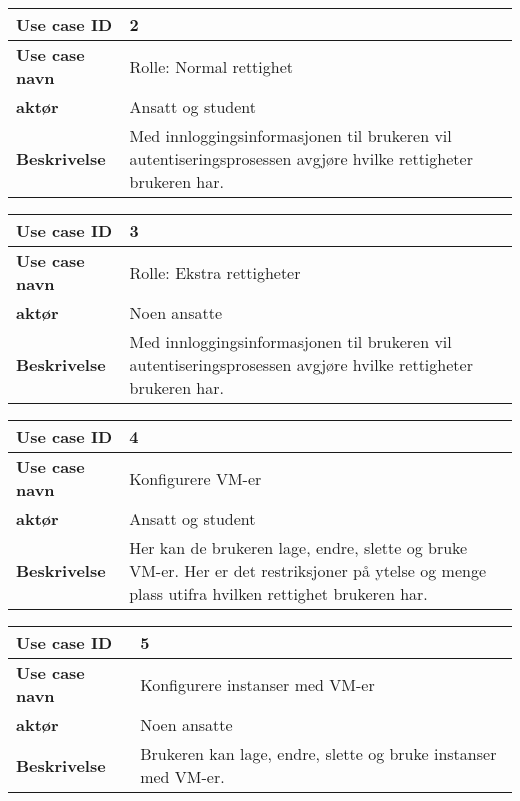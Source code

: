 \begin{table}[H]
	\begin{tabular}[Figur 3]{| p{2cm} | p{9cm} |}
		\hline \rowcolor{lightgray} \textbf{Use case ID} & 2 \\
		\hline \rowcolor{darkgray} \textbf{Use case navn} & Rolle: Normal rettighet \\
		\hline \rowcolor{darkgray} \textbf{aktør} & Ansatt og student\\
		\hline \rowcolor{lightgray} \textbf{Beskrivelse} & Med innloggingsinformasjonen til brukeren vil autentiseringsprosessen avgjøre hvilke rettigheter brukeren har. \\
		\hline
	\end{tabular}
\end{table}

\begin{table}[H]
	\begin{tabular}[Figur 4]{| p{2cm} | p{9cm} |}
		\hline \rowcolor{lightgray} \textbf{Use case ID} & 3 \\
		\hline \rowcolor{darkgray} \textbf{Use case navn} & Rolle: Ekstra rettigheter \\
		\hline \rowcolor{lightgray} \textbf{aktør} & Noen ansatte\\
		\hline \rowcolor{darkgray} \textbf{Beskrivelse} & Med innloggingsinformasjonen til brukeren vil autentiseringsprosessen avgjøre hvilke rettigheter brukeren har. \\
		\hline
	\end{tabular}
\end{table}

\begin{table}[H]
	\begin{tabular}[Figur 5]{| p{2cm} | p{9cm} |}
		\hline \rowcolor{lightgray} \textbf{Use case ID} & 4 \\
		\hline \rowcolor{darkgray} \textbf{Use case navn} & Konfigurere VM-er \\
		\hline \rowcolor{lightgray} \textbf{aktør} & Ansatt og student\\
		\hline \rowcolor{darkgray} \textbf{Beskrivelse} & Her kan de brukeren lage, endre, slette og bruke VM-er. Her er det restriksjoner på ytelse og menge plass utifra hvilken rettighet brukeren har. \\
		\hline
	\end{tabular}
\end{table}

\begin{table}[H]
	\begin{tabular}[Figur 6]{| p{2cm} | p{9cm} |}
		\hline \rowcolor{lightgray} \textbf{Use case ID} & 5 \\
		\hline \rowcolor{darkgray} \textbf{Use case navn} & Konfigurere instanser med VM-er \\
		\hline \rowcolor{lightgray} \textbf{aktør} & Noen ansatte\\
		\hline \rowcolor{darkgray} \textbf{Beskrivelse} & Brukeren kan lage, endre, slette og bruke instanser med VM-er. \\
		\hline
	\end{tabular}
\end{table}

